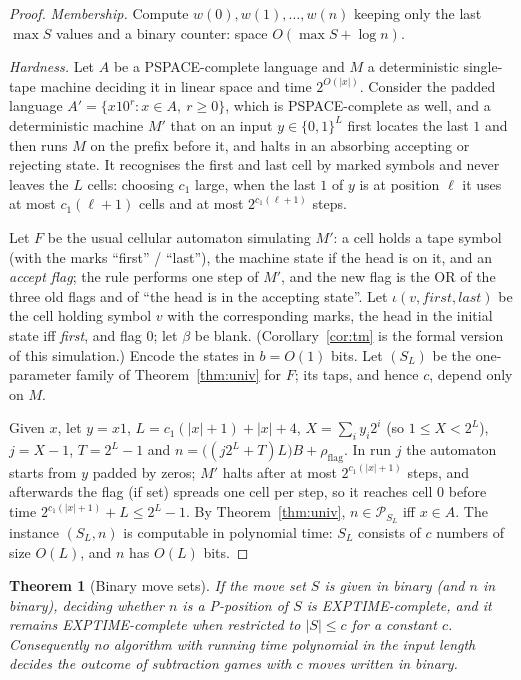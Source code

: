 \documentclass[11pt]{article}
\newtheorem{theorem}{Theorem}
\theoremstyle{definition}
\newcommand{\cP}{\mathcal{P}}
\begin{document}
\begin{proof}
\emph{Membership.}  Compute $w(0),w(1),\dots,w(n)$ keeping only the last $\max S$ values and a
binary counter: space $O(\max S+\log n)$.

\emph{Hardness.}  Let $A$ be a PSPACE-complete language and $M$ a deterministic single-tape machine
deciding it in linear space and time $2^{O(|x|)}$.  Consider the padded language
$A'=\{x10^r: x\in A,\ r\ge0\}$, which is PSPACE-complete as well, and a deterministic machine $M'$
that on an input $y\in\{0,1\}^L$ first locates the last $1$ and then runs $M$ on the prefix before it,
and halts in an absorbing accepting or rejecting state.  It recognises the first and last cell by
marked symbols and never leaves the $L$ cells: choosing $c_1$ large, when the last $1$ of $y$ is at
position $\ell$ it uses at most $c_1(\ell+1)$ cells and at most $2^{c_1(\ell+1)}$ steps.

Let $F$ be the usual cellular automaton simulating $M'$: a cell holds a tape symbol (with the marks
``first'' / ``last''), the machine state if the head is on it, and an \emph{accept flag}; the rule
performs one step of $M'$, and the new flag is the OR of the three old flags and of ``the head is in
the accepting state''.  Let $\iota(v,\textit{first},\textit{last})$ be the cell holding symbol $v$
with the corresponding marks, the head in the initial state iff \textit{first}, and flag $0$; let
$\beta$ be blank.  (Corollary~\ref{cor:tm} is the formal version of this simulation.)  Encode the states
in $b=O(1)$ bits.  Let $(S_L)$ be the one-parameter family of
Theorem~\ref{thm:univ} for $F$; its taps, and hence $c$, depend only on $M$.

Given $x$, let $y=x1$, $L=c_1(|x|+1)+|x|+4$, $X=\sum_i y_i2^i$ (so $1\le X<2^L$), $j=X-1$, $T=2^L-1$ and
$n=\bigl((j2^L+T)L\bigr)B+\rho_{\mathrm{flag}}$.  In run $j$ the automaton starts from $y$ padded by
zeros; $M'$ halts after at most $2^{c_1(|x|+1)}$ steps, and afterwards the flag (if set) spreads one
cell per step, so it reaches cell $0$ before time $2^{c_1(|x|+1)}+L\le 2^L-1$.  By
Theorem~\ref{thm:univ}, $n\in\cP_{S_L}$ iff $x\in A$.  The instance $(S_L,n)$ is computable in
polynomial time: $S_L$ consists of $c$ numbers of size $O(L)$, and $n$ has $O(L)$ bits.
\end{proof}

\begin{theorem}[Binary move sets]\label{thm:exptime}
If the move set $S$ is given in binary (and $n$ in binary), deciding whether $n$ is a P-position of
$S$ is EXPTIME-complete, and it remains EXPTIME-complete when restricted to $|S|\le c$ for a constant
$c$.  Consequently no algorithm with running time polynomial in the input length decides the outcome
of subtraction games with $c$ moves written in binary.
\end{theorem}
\end{document}
